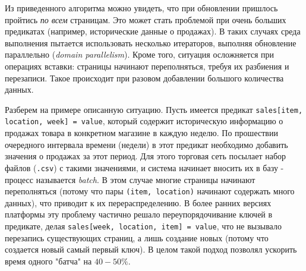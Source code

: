 Из приведенного алгоритма можно увидеть, что при обновлении пришлось пройтись \emph{по всем} страницам. Это может стать проблемой при очень больших предикатах (например, исторические данные о продажах). В таких случаях среда выполнения пытается использовать несколько итераторов, выполняя обновление параллельно (\emph{domain parallelism}). Кроме того, ситуация осложняется при операциях вставки: страницы начинают переполняться, требуя их разбиения и перезаписи. Такое происходит при разовом добавлении большого количества данных.

Разберем на примере описанную ситуацию. Пусть имеется предикат \lstinline{sales[item, location, week] = value}, который содержит историческую информацию о продажах товара в конкретном магазине в каждую неделю. По прошествии очередного интервала времени (недели) в этот предикат необходимо добавить значения о продажах за этот период. Для этого торговая сеть посылает набор файлов (\lstinline{.csv}) с такими значениями, и система начинает вносить их в базу - процесс называется \emph{batch}. В этом случае многие страницы начинают переполняться (потому что пары \lstinline{(item, location)} начинают содержать много данных), что приводит к их перераспределению. В более ранних версиях платформы эту проблему частично решало переупорядочивание ключей в предикате, делая \lstinline{sales[week, location, item] = value}, что не вызывало перезапись существующих страниц, а лишь создание новых (потому что создается новый самый первый ключ). В целом такой подход позволял ускорить время одного "батча" на $40-50\%$.
